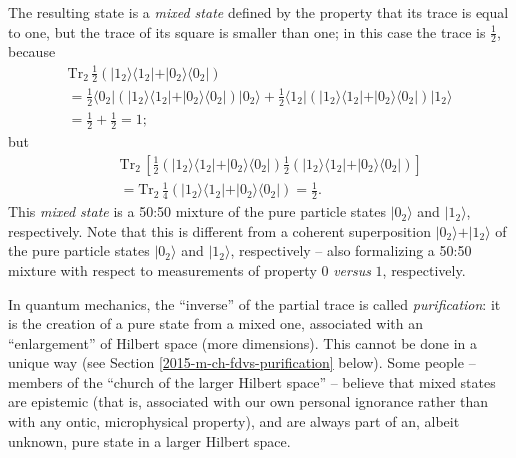 {The resulting state is a
{\em mixed state}
defined by the property that its trace is equal to one,
but the trace of its square is smaller than one; in this case the trace is $\frac{1}{2}$, because
\begin{equation}
 \begin{split}
\textrm{Tr}_2\,
\frac{1}{2}
\left(
\vert 1_2 \rangle \langle   1_2 \vert
+
\vert 0_2 \rangle \langle   0_2 \vert
\right)  \\
 = \frac{1}{2}  \langle 0_2 \vert
\left(
\vert 1_2 \rangle \langle   1_2 \vert
+
\vert 0_2 \rangle \langle   0_2 \vert
\right)
\vert 0_2 \rangle
+  \frac{1}{2}
\langle 1_2  \vert
\left(
\vert 1_2 \rangle \langle   1_2 \vert
+
\vert 0_2 \rangle \langle   0_2 \vert
\right)
\vert 1_2 \rangle  \\
=  \frac{1}{2} + \frac{1}{2} =1;
 \end{split}
\end{equation}
but
\begin{eqnarray}
&&\textrm{Tr}_2\,
\left[
\frac{1}{2}
\left(
\vert 1_2 \rangle \langle   1_2 \vert
+
\vert 0_2 \rangle \langle   0_2 \vert
\right)
\frac{1}{2}
\left(
\vert 1_2 \rangle \langle   1_2 \vert
+
\vert 0_2 \rangle \langle   0_2 \vert
\right)
\right]
\nonumber
\\ && =
\textrm{Tr}_2\,
\frac{1}{4}
\left(
\vert 1_2 \rangle \langle   1_2 \vert
+
\vert 0_2 \rangle \langle   0_2 \vert
\right)
= \frac{1}{2}.
\end{eqnarray}
This {\em mixed state} is a 50:50 mixture of the pure particle states  $\vert 0_2 \rangle$ and $\vert 1_2 \rangle$, respectively.
Note that this is different from
a coherent superposition
$\vert 0_2 \rangle + \vert 1_2 \rangle$
 of the pure particle states  $\vert 0_2 \rangle$ and $\vert 1_2 \rangle$, respectively --
also formalizing a 50:50 mixture with respect to measurements of property $0$ {\it versus} $1$, respectively.

\eexample
}

In quantum mechanics, the ``inverse'' of the partial trace is called
{\em purification}:
it is the creation of a pure state from a mixed one,
associated with an ``enlargement'' of Hilbert space (more dimensions).
This cannot be done in a unique way (see Section \ref{2015-m-ch-fdvs-purification} below).
Some people -- members of the ``church of the larger Hilbert space'' --
believe that mixed states are epistemic (that is, associated with our own personal ignorance rather than with
any ontic, microphysical property), and are always part of an, albeit unknown, pure state in a larger Hilbert space.


